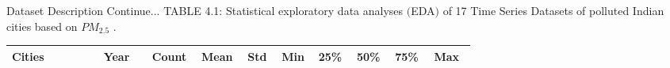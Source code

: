 \documentclass[12pt, aspectratio=169]{beamer}
\begin{document}
\begin{frame}{Dataset Description  \tiny{Continue...}}
	\centering
	\scriptsize {TABLE 4.1: Statistical exploratory data analyses $($EDA$)$ of 17 Time Series Datasets of polluted Indian cities based on $PM_{2.5}$ \cite{bhawan2020central}.}\\
	\begin{table}
		\begin{tabular}{|p{0.17\linewidth}|p{0.09\linewidth}|p{0.05\linewidth}|p{0.05\linewidth}|p{0.05\linewidth}|p{0.04\linewidth}|p{0.05\linewidth}|p{0.05\linewidth}|p{0.06\linewidth}|p{0.07\linewidth}|} \hline
		\footnotesize \textbf{Cities}&\footnotesize \textbf{Year} & \footnotesize \textbf{Count} & \footnotesize \textbf{Mean} & \footnotesize \textbf{Std} & \footnotesize \textbf{Min} & \footnotesize \textbf{25\%} &\footnotesize \textbf{50\%} &\footnotesize \textbf{75\%} & \footnotesize \textbf{Max}  \\ \hline
		

\end{tabular}
\end{table}
\end{frame}
\end{document}
